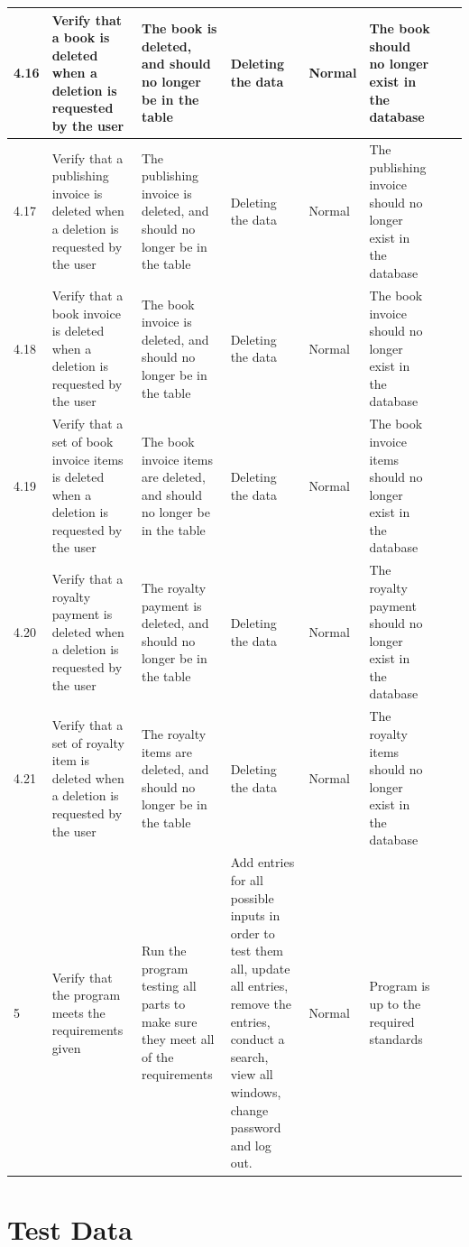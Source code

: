 \begin{landscape}
\begin{center}
\begin{longtable}{|p{1.5cm}|p{2cm}|p{2.5cm}|p{2.5cm}|p{2cm}|p{2cm}|p{2cm}|p{2cm}|}
\rowcolor{lightgray} 4.16 & Verify that a book is deleted when a deletion is requested by the user & The book is deleted, and should no longer be in the table & Deleting the data & Normal & The book should no longer exist in the database & & \\ \hline
\rowcolor{lightgray} 4.17 & Verify that a publishing invoice is deleted when a deletion is requested by the user & The publishing invoice is deleted, and should no longer be in the table & Deleting the data & Normal & The publishing invoice should no longer exist in the database & & \\ \hline
\rowcolor{lightgray} 4.18 & Verify that a book invoice is deleted when a deletion is requested by the user & The book invoice is deleted, and should no longer be in the table & Deleting the data & Normal & The book invoice should no longer exist in the database & & \\ \hline
\rowcolor{lightgray} 4.19 & Verify that a set of book invoice items is deleted when a deletion is requested by the user & The book invoice items are deleted, and should no longer be in the table & Deleting the data & Normal & The book invoice items should no longer exist in the database & & \\ \hline
\rowcolor{lightgray} 4.20 & Verify that a royalty payment is deleted when a deletion is requested by the user & The royalty payment is deleted, and should no longer be in the table & Deleting the data & Normal & The royalty payment should no longer exist in the database & & \\ \hline
\rowcolor{lightgray} 4.21 & Verify that a set of royalty item is deleted when a deletion is requested by the user & The royalty items are deleted, and should no longer be in the table & Deleting the data & Normal & The royalty items should no longer exist in the database & & \\ \hline
        5 & Verify that the program meets the requirements given & Run the program testing all parts to make sure they meet all of the requirements & Add entries for all possible inputs in order to test them all, update all entries, remove the entries, conduct a search, view all windows, change password and log out. & Normal & Program is up to the required standards & & \\ \hline
    \end{longtable}
\end{center}

\section{Test Data}


\end{landscape}
